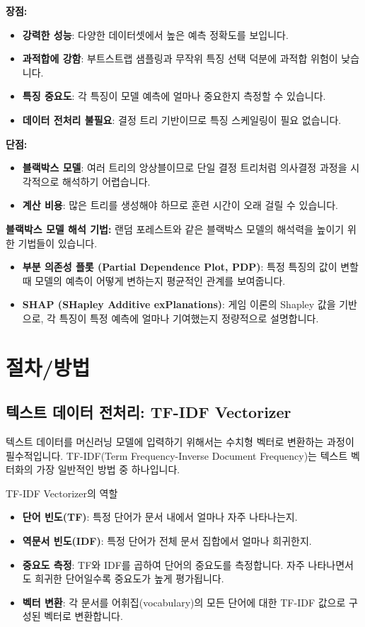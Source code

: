 \documentclass[11pt,a4paper]{article}
\begin{document}
\textbf{장점:}
\begin{itemize}
    \item \textbf{강력한 성능}: 다양한 데이터셋에서 높은 예측 정확도를 보입니다.
    \item \textbf{과적합에 강함}: 부트스트랩 샘플링과 무작위 특징 선택 덕분에 과적합 위험이 낮습니다.
    \item \textbf{특징 중요도}: 각 특징이 모델 예측에 얼마나 중요한지 측정할 수 있습니다.
    \item \textbf{데이터 전처리 불필요}: 결정 트리 기반이므로 특징 스케일링이 필요 없습니다.
\end{itemize}

\textbf{단점:}
\begin{itemize}
    \item \textbf{블랙박스 모델}: 여러 트리의 앙상블이므로 단일 결정 트리처럼 의사결정 과정을 시각적으로 해석하기 어렵습니다.
    \item \textbf{계산 비용}: 많은 트리를 생성해야 하므로 훈련 시간이 오래 걸릴 수 있습니다.
\end{itemize}

\textbf{블랙박스 모델 해석 기법:}
랜덤 포레스트와 같은 블랙박스 모델의 해석력을 높이기 위한 기법들이 있습니다.
\begin{itemize}
    \item \textbf{부분 의존성 플롯 (Partial Dependence Plot, PDP)}: 특정 특징의 값이 변할 때 모델의 예측이 어떻게 변하는지 평균적인 관계를 보여줍니다.
    \item \textbf{SHAP (SHapley Additive exPlanations)}: 게임 이론의 Shapley 값을 기반으로, 각 특징이 특정 예측에 얼마나 기여했는지 정량적으로 설명합니다.
\end{itemize}

\newpage
\section*{절차/방법}

\subsection{텍스트 데이터 전처리: TF-IDF Vectorizer}

텍스트 데이터를 머신러닝 모델에 입력하기 위해서는 수치형 벡터로 변환하는 과정이 필수적입니다. TF-IDF(Term Frequency-Inverse Document Frequency)는 텍스트 벡터화의 가장 일반적인 방법 중 하나입니다.

\begin{infobox}{TF-IDF Vectorizer의 역할}
\begin{itemize}
    \item \textbf{단어 빈도(TF)}: 특정 단어가 문서 내에서 얼마나 자주 나타나는지.
    \item \textbf{역문서 빈도(IDF)}: 특정 단어가 전체 문서 집합에서 얼마나 희귀한지.
    \item \textbf{중요도 측정}: TF와 IDF를 곱하여 단어의 중요도를 측정합니다. 자주 나타나면서도 희귀한 단어일수록 중요도가 높게 평가됩니다.
    \item \textbf{벡터 변환}: 각 문서를 어휘집(vocabulary)의 모든 단어에 대한 TF-IDF 값으로 구성된 벡터로 변환합니다.
\end{itemize}
\end{infobox}
\end{document}
